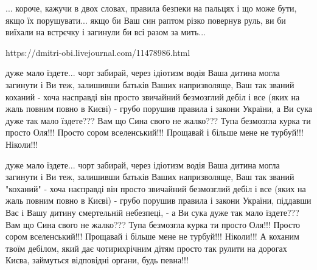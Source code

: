 ... короче, кажучи в двох словах, правила безпеки на пальцях і що може бути,
якщо їх порушувати... якщо би Ваш син раптом різко повернув руль, ви би виїхали
на встрєчку і загинули би всі разом за мить...

https://dmitri-obi.livejournal.com/11478986.html

дуже мало їздете... чорт забирай, через ідіотизм водія Ваша дитина могла загинути і Ви теж,
залишивши батьків Ваших напризволяще,
Ваш так званий коханий - хоча насправді він просто звичайний безмозглий дебіл і все (яких на жаль повним повно в Києві) - грубо порушив правила і закони України, а Ви сука дуже так мало їздете???
Вам що Сина свого не жалко??? Тупа безмозгла курка ти просто Оля!!!
Просто сором вселенський!!!
Прощавай і більше мене не турбуй!!! Ніколи!!!

дуже мало їздете... чорт забирай, через ідіотизм водія Ваша дитина могла загинути і Ви теж,
залишивши батьків Ваших напризволяще,
Ваш так званий "коханий" - хоча насправді він просто звичайний безмозглий дебіл і все (яких на жаль повним повно в Києві) -   грубо порушив правила і закони України, піддавши Вас і Вашу дитину смертельній небезпеці, - а Ви сука дуже так мало їздете???
Вам що Сина свого не жалко??? Тупа безмозгла курка ти просто Оля!!!
Просто сором вселенський!!!
Прощавай і більше мене не турбуй!!! Ніколи!!! А коханим твоїм дебілом, який дає чотирихрічним дітям просто так рулити на дорогах Києва, займуться відповідні органи, будь певна!!!


